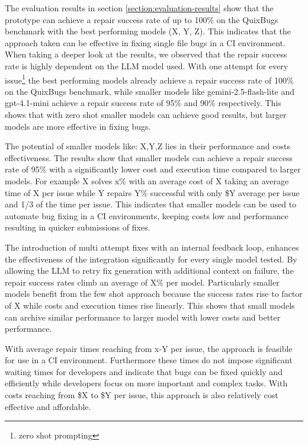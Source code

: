 The evaluation results in section \ref{section:evaluation-results} show that the prototype can achieve a repair success rate of up to 100\% on the QuixBugs benchmark with the best performing models (X, Y, Z). This indicates that the approach taken can be effective in fixing single file bugs in a CI environment. When taking a deeper look at the results, we observed that the repair success rate is highly dependent on the LLM model used.
With one attempt for every issue\footnote{zero shot prompting} the best performing models already achieve a repair success rate of 100\% on the QuixBugs benchmark, while smaller models like gemini-2.5-flash-lite and gpt-4.1-mini achieve a repair success rate of 95\% and 90\% respectively. This shows that with zero shot smaller models can achieve good results, but larger models are more effective in fixing bugs.

The potential of smaller models like: X,Y,Z lies in their performance and costs effectiveness. The results show that smaller models can achieve a repair success rate of 95\% with a significantly lower cost and execution time compared to larger models. For example X solves x\% with an average cost of X taking an average time of X per issue while Y repairs Y\% successful with only \$Y average per issue and 1/3 of the time per issue. This indicates that smaller models can be used to automate bug fixing in a CI environments, keeping costs low and performance resulting in quicker submissions of fixes.

The introduction of multi attempt fixes with an internal feedback loop, enhances the effectiveness of the integration significantly for every single model tested. By allowing the LLM to retry fix generation with additional context on failure, the repair success rates climb an average of X\% per model. Particularly smaller models benefit from the few shot approach because the success rates rise to factor of X while costs and execution times rise linearly. This shows that small models can archive similar performance to larger model with lower costs and better performance.

With average repair times reaching from x-Y per issue, the approach is feasible for use in a CI environment. Furthermore these times do not impose significant waiting times for developers and indicate that bugs can be fixed quickly and efficiently while developers focus on more important and complex tasks. With costs reaching from \$X to \$Y per issue, this approach is also relatively cost effective and affordable.

